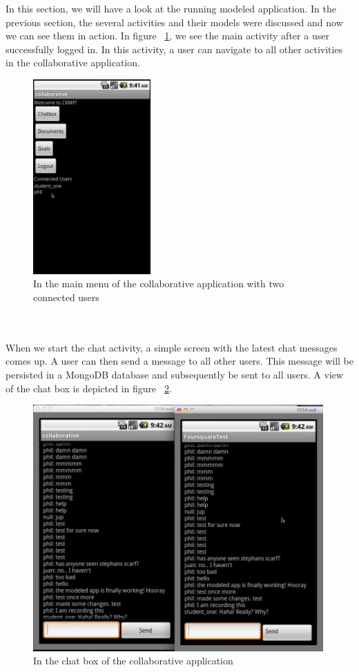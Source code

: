 In this section, we will have a look at the running modeled application. In the previous section, the several activities and their models were discussed and now we can see them in action. In figure ~\ref{fig:coll_connected}, we see the main activity after a user successfully logged in. In this activity, a user can navigate to all other activities in the collaborative application.
\begin{figure}[h!]
\centering
\includegraphics[width=0.4\textwidth]{images/chap7_connected.png}
\caption{In the main menu of the collaborative application with two connected users}
\label{fig:coll_connected}
\end{figure} \\ \\
When we start the chat activity, a simple screen with the latest chat messages comes up. A user can then send a message to all other users. This message will be persisted in a MongoDB database and subsequently be sent to all users. A view of the chat box is depicted in figure ~\ref{fig:coll_chatbox}. 
\begin{figure}[h!]
\centering
\includegraphics[width=0.99\textwidth]{images/chap7_chatbox.png}
\caption{In the chat box of the collaborative application}
\label{fig:coll_chatbox}
\end{figure} \\ \\
